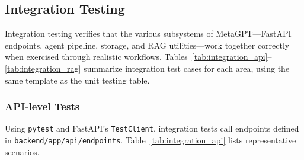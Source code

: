 \subsection{Integration Testing}

Integration testing verifies that the various subsystems of MetaGPT---FastAPI endpoints, agent pipeline, storage, and RAG utilities---work together correctly when exercised through realistic workflows. Tables~\ref{tab:integration_api}--\ref{tab:integration_rag} summarize integration test cases for each area, using the same template as the unit testing table.

\subsubsection*{API-level Tests}
Using \texttt{pytest} and FastAPI's \texttt{TestClient}, integration tests call endpoints defined in \texttt{backend/\allowbreak{}app/\allowbreak{}api/\allowbreak{}endpoints}. Table~\ref{tab:integration_api} lists representative scenarios.

